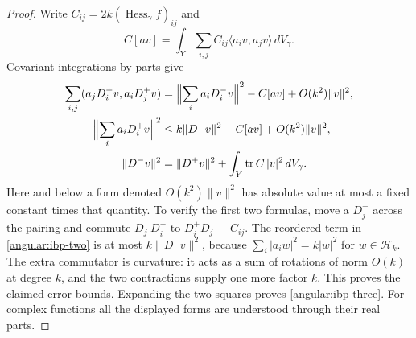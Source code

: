\begin{proof}
Write $C_{ij}=2k(\operatorname{Hess}_\gamma f)_{ij}$ and
\[
 C[av]=\int_Y\sum_{i,j}C_{ij}\langle a_iv,a_jv\rangle\,dV_\gamma.
\]
Covariant integrations by parts give
\begin{align}
 \sum_{i,j}(a_jD_i^+v,a_iD_j^+v)
   &=\Bigl\|\sum_i a_iD_i^-v\Bigr\|^2-C[av]
                                    +O(k^2)\|v\|^2,\label{angular:ibp-one}\\
 \Bigl\|\sum_i a_iD_i^+v\Bigr\|^2
   &\le k\|D^-v\|^2-C[av]+O(k^2)\|v\|^2,\label{angular:ibp-two}\\
 \|D^-v\|^2
   &=\|D^+v\|^2+\int_Y\operatorname{tr} C\,|v|^2\,dV_\gamma.
                                                    \label{angular:ibp-three}
\end{align}
Here and below a form denoted $O(k^2)\|v\|^2$ has absolute value at most
a fixed constant times that quantity.  To verify the first two formulas,
move a $D_j^+$ across the pairing and commute
$D_j^-D_i^+$ to $D_i^+D_j^--C_{ij}$.  The reordered term in
\eqref{angular:ibp-two} is at most $k\|D^-v\|^2$, because
$\sum_i|a_iw|^2=k|w|^2$ for $w\in\mathcal H_k$.
The extra commutator is curvature: it acts as a sum of rotations of norm
$O(k)$ at degree $k$, and the two contractions supply one more factor $k$.
This proves the claimed error bounds.  Expanding the two squares proves
\eqref{angular:ibp-three}.  For complex functions all the displayed forms
are understood through their real parts.


\end{proof}

